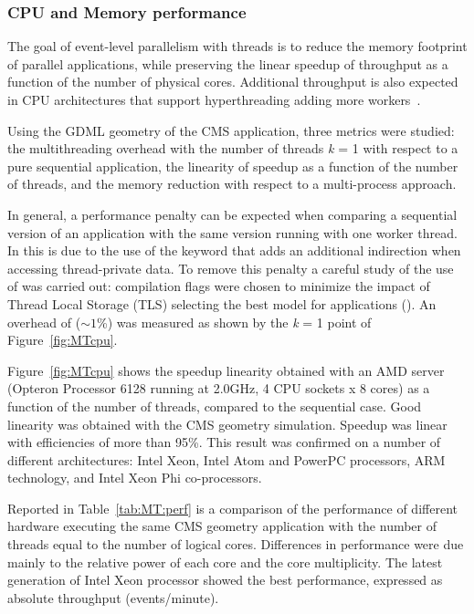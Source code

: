 \subsubsection{CPU and Memory performance}
The goal of event-level parallelism with threads is to reduce the memory 
footprint of parallel applications, while preserving the linear speedup of
throughput as a function of the number of physical cores.
Additional throughput is also expected in CPU architectures that support 
hyperthreading adding more workers~\cite{MT:leng2002study}.

Using the GDML geometry of the CMS application, three metrics were studied: the 
multithreading overhead with the number of threads {\it k} = 1 with respect to
a pure sequential application, the linearity of speedup as a function of the 
number of threads, and the memory reduction with respect to a multi-process 
approach.

In general, a performance penalty can be expected when comparing a sequential 
version of an application with the same version running with one worker thread.
In \Gfour{} this is due to the use of the \thread keyword that adds an additional 
indirection when accessing thread-private data. To remove this penalty a careful 
study of the use of \thread was carried out: compilation flags were chosen to 
minimize the impact of Thread Local Storage (TLS) selecting the best model for
\Gfour{} applications ().  An overhead of ($\sim1$\%)
was measured as shown by the {\it k} = 1 point of Figure~\ref{fig:MTcpu}.

Figure~\ref{fig:MTcpu} shows the speedup linearity obtained with an AMD server
(Opteron Processor 6128 running at 2.0GHz, 4 CPU sockets x 8 cores) as a 
function of the number of threads, compared to the sequential case.  Good 
linearity was obtained with the CMS geometry simulation.  Speedup was linear 
with efficiencies of more than 95\%.  This result was confirmed on a number of 
different architectures: Intel Xeon, Intel Atom and PowerPC processors, ARM 
technology, and Intel Xeon Phi co-processors.  

Reported in Table~\ref{tab:MT:perf} is a comparison of the performance of 
different hardware executing the same CMS geometry application with the number
of threads equal to the number of logical cores.  Differences in performance 
were due mainly to the relative power of each core and the core multiplicity.  
The latest generation of Intel Xeon processor showed the best performance, 
expressed as absolute throughput (events/minute).

